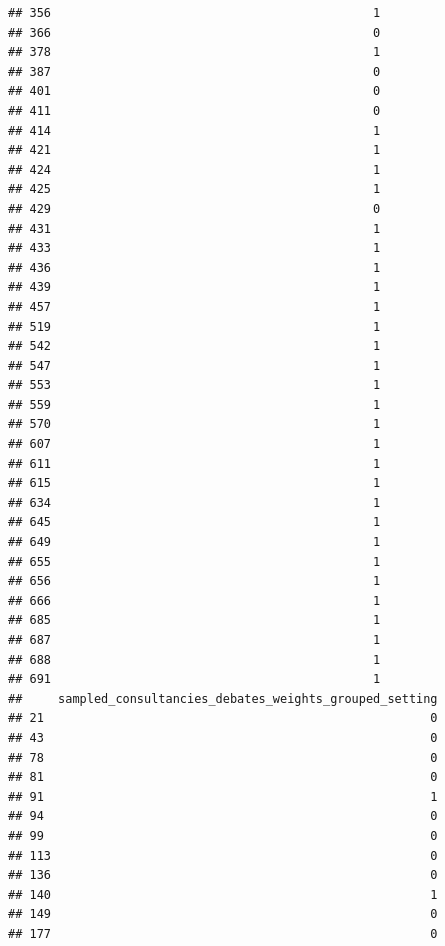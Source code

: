 \documentclass[
]{article}
\begin{document}
\begin{verbatim}
## 356                                             1
## 366                                             0
## 378                                             1
## 387                                             0
## 401                                             0
## 411                                             0
## 414                                             1
## 421                                             1
## 424                                             1
## 425                                             1
## 429                                             0
## 431                                             1
## 433                                             1
## 436                                             1
## 439                                             1
## 457                                             1
## 519                                             1
## 542                                             1
## 547                                             1
## 553                                             1
## 559                                             1
## 570                                             1
## 607                                             1
## 611                                             1
## 615                                             1
## 634                                             1
## 645                                             1
## 649                                             1
## 655                                             1
## 656                                             1
## 666                                             1
## 685                                             1
## 687                                             1
## 688                                             1
## 691                                             1
##     sampled_consultancies_debates_weights_grouped_setting
## 21                                                      0
## 43                                                      0
## 78                                                      0
## 81                                                      0
## 91                                                      1
## 94                                                      0
## 99                                                      0
## 113                                                     0
## 136                                                     0
## 140                                                     1
## 149                                                     0
## 177                                                     0

\end{verbatim}
\end{document}

